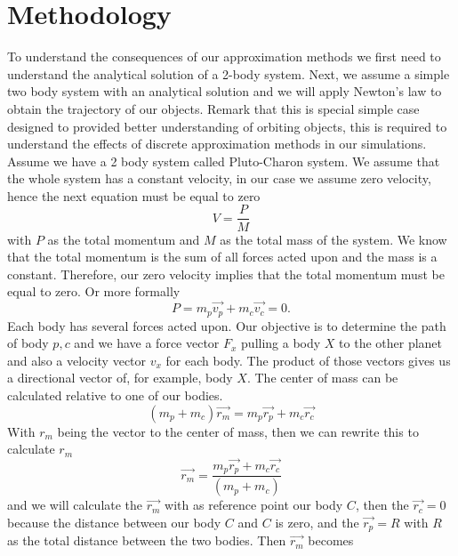 \documentclass[11pt]{article} %
\begin{document}
\section{Methodology}
\label{sec:methodology}
To understand the consequences of our approximation methods we first need to understand the analytical solution of a 2-body system. Next, we assume a simple two body system with an analytical solution and we will apply Newton's law to obtain the trajectory of our objects. Remark that this is special simple case designed to provided better understanding of orbiting objects, this is required to understand the effects of discrete approximation methods in our simulations. \\
\indent Assume we have a 2 body system called Pluto-Charon system. 
We assume that the whole system has a constant velocity, in our case we assume zero velocity, hence the next equation must be equal to zero
\begin{equation}
	V = \frac{P}{M}	
\end{equation}
with $P$ as the total momentum and $M$ as the total mass of the system. We know that the total momentum is the sum of all forces acted upon and the mass is a constant. Therefore, our zero velocity implies that the total momentum must be equal to zero. Or more formally
\begin{equation}
	P = m_p\overrightarrow{v_p} + m_c\overrightarrow{v_c} = 0.
\end{equation}
Each body has several forces acted upon. Our objective is to determine the path of body $p,c$ and we have a force vector $F_x$ pulling a body $X$ to the other planet and also a velocity vector $v_x$ for each body. The product of those vectors gives us a directional vector of, for example, body $X$. The center of mass can be calculated relative to one of our bodies.
\begin{equation}
	(m_p + m_c)\overrightarrow{r_{m}} = m_p\overrightarrow{r_p} + m_c\overrightarrow{r_c} 
\end{equation}
With $r_m$ being the vector to the center of mass, then we can rewrite this to calculate $r_m$
\begin{equation}
	\overrightarrow{r_m} = \frac{m_p\overrightarrow{r_p} + m_c\overrightarrow{r_c}}{(m_p + m_c)}
\end{equation}
and we will calculate the $\overrightarrow{r_m}$ with as reference point our body $C$, then the $\overrightarrow{r_c}=0$ because the distance between our body $C$ and $C$ is zero, and the $\overrightarrow{r_p}=R$ with $R$ as the total distance between the two bodies. Then $\overrightarrow{r_m}$ becomes
\end{document}
